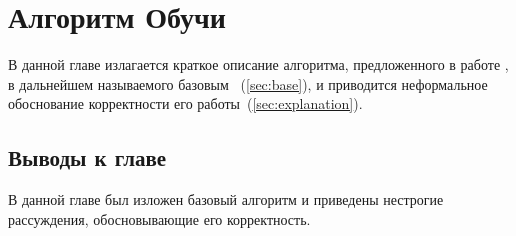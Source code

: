 \chapter{Алгоритм Обучи}

В данной главе излагается краткое описание алгоритма, предложенного в работе \cite{Ohbuchi}, в дальнейшем называемого базовым~ 
(\ref{sec:base}), и приводится неформальное обоснование корректности его работы~(\ref{sec:explanation}).



\section{Выводы к главе}
В данной главе был изложен базовый алгоритм и приведены нестрогие рассуждения, обосновывающие его корректность.
